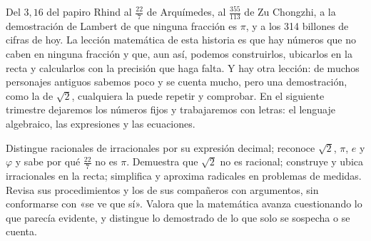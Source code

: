 \documentclass[11pt]{article}
\begin{document}

Del $3{,}16$ del papiro Rhind al $\frac{22}{7}$ de Arquímedes, al
$\frac{355}{113}$ de Zu Chongzhi, a la demostración de Lambert de que
ninguna fracción es $\pi$, y a los 314 billones de cifras de hoy. La lección
matemática de esta historia es que hay números que no caben en ninguna
fracción y que, aun así, podemos construirlos, ubicarlos en la recta y
calcularlos con la precisión que haga falta. Y hay otra lección: de muchos
personajes antiguos sabemos poco y se cuenta mucho, pero una demostración,
como la de $\sqrt{2}$, cualquiera la puede repetir y comprobar. En el
siguiente trimestre dejaremos los números fijos y trabajaremos con letras:
el lenguaje algebraico, las expresiones y las ecuaciones.

\matrizevaluacion
  {Distingue racionales de irracionales por su expresión decimal; reconoce
   $\sqrt{2}$, $\pi$, $e$ y $\varphi$ y sabe por qué $\frac{22}{7}$ no es $\pi$.}
  {Demuestra que $\sqrt{2}$ no es racional; construye y ubica irracionales
   en la recta; simplifica y aproxima radicales en problemas de medidas.}
  {Revisa sus procedimientos y los de sus compañeros con argumentos, sin
   conformarse con «se ve que sí».}
  {Valora que la matemática avanza cuestionando lo que parecía evidente, y
   distingue lo demostrado de lo que solo se sospecha o se cuenta.}

\autoevaluacion

\seguimientodocente
\end{document}

